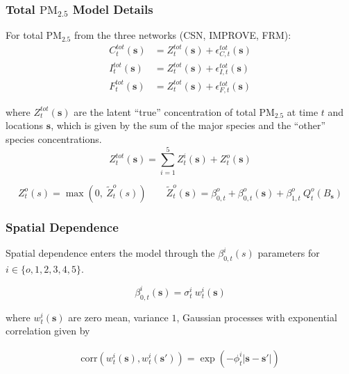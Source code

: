 \documentclass[t]{beamer}\usepackage[]{graphicx}\usepackage[]{color}
\newcommand{\PM}{$\text{PM}_{2.5}$ }
\begin{document}

\begin{frame}
\frametitle{Total \PM Model Details}

For total \PM from the three networks (CSN, IMPROVE, FRM):
%
\begin{align*}
C_t^{tot}(\bm{s}) &= Z_t^{tot}(\bm{s}) + \epsilon_{C,t}^{tot}(\bm{s}) \\
I_t^{tot}(\bm{s}) &= Z_t^{tot}(\bm{s}) + \epsilon_{I,t}^{tot}(\bm{s}) \\
F_t^{tot}(\bm{s}) &= Z_t^{tot}(\bm{s}) + \epsilon_{F,t}^{tot}(\bm{s})
\end{align*}

where $Z_t^{tot}(\bm{s})$ are the latent ``true'' concentration of total \PM at time $t$ and locations $\bm{s}$, which is given by the sum of the major species and the ``other'' species concentrations.
%
\[ Z^{tot}_{t}(\bm{s}) = \sum_{i=1}^{5} Z^i_t(\bm{s}) + Z^{o}_{t}(\bm{s}) \]

{\footnotesize
\[
{Z}_t^o(s) = \max{}\left(0,~\widetilde{Z}_t^o(s)\right) \qquad
\widetilde{Z}_t^{o}(\bm{s}) = \beta_{0,t}^o +\beta_{0,t}^o(\bm{s}) + \beta_{1,t}^o \: Q_t^o(B_{\bm{s}})
\]
}

\end{frame}


\begin{frame}
\frametitle{Spatial Dependence}

Spatial dependence enters the model through the $\beta_{0,t}^i(s)$ parameters for $i \in \{o,1,2,3,4,5\}$.

\[ \beta_{0,t}^i(\bm{s}) = {\sigma}^i_t~w^i_t(\bm{s}) \]

\vspace{5mm}

where $w^i_{t}(\bm{s})$ are zero mean, variance $1$, Gaussian processes with exponential correlation given by 

\begin{align*}
\text{corr}(w^i_{t}(\bm{s}),w^i_{t}(\bm{s}')) = \exp(-\phi^i_{t} |\bm{s}-\bm{s}'|)
\end{align*}


\end{frame}

\end{document}
